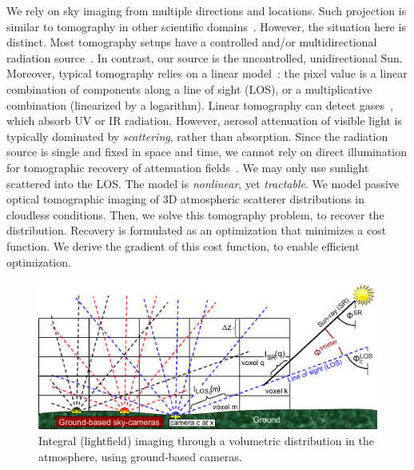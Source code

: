 \documentclass[10pt,letterpaper]{article}
\newcommand{\yoavcomment}[1]{}
\renewcommand{\yoavcomment}[1]{#1} %
\begin{document}
We rely on sky imaging from multiple directions and locations. Such
projection is similar to tomography in other scientific
domains~\cite{Bluestone2001,ihrke}. However, the situation here is
distinct. Most tomography setups have a controlled and/or
multidirectional radiation source~\cite{Boas2001,messer}. In contrast,
our source is the uncontrolled, unidirectional Sun. Moreover, typical
tomography relies on a linear model~\cite{gregson}: the pixel value is
a linear combination of components along a line of sight (LOS), or a
multiplicative combination (linearized by a logarithm). Linear
tomography can detect gases~\cite{Cosofret2009}, which absorb UV or IR
radiation. However, aerosol attenuation of visible light is typically
dominated by {\em scattering}, rather than absorption. Since the
radiation source is single and fixed in space and time, we cannot rely
on direct illumination for tomographic recovery of attenuation
fields~\cite{Aviles2011}. We may only use sunlight scattered into the
LOS. The model is {\em nonlinear}, yet {\em tractable}. We model
passive optical tomographic imaging of 3D atmospheric scatterer
distributions in cloudless conditions. Then, we solve this tomography
problem, to recover the distribution. Recovery is formulated as an
optimization that minimizes a cost function. We derive the gradient of
this cost function, to enable efficient optimization.
\begin{figure}[t!]
  \begin{center}
    \yoavcomment{\includegraphics[width=\linewidth]{images/groundtomog24.pdf}}
  \end{center}
  \caption{\small Integral (lightfield) imaging through a volumetric
    distribution in the atmosphere, using ground-based cameras.}
  \label{fig:groundgrid}
\end{figure}


\end{document}
